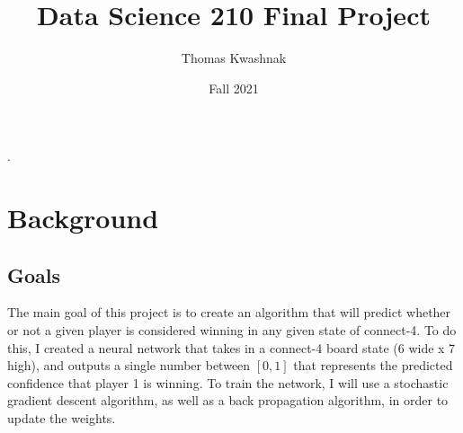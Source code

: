 \documentclass[10pt]{article}
\title{Data Science 210 Final Project}
\author{Thomas Kwashnak}
\date{Fall 2021}
\begin{document}
\maketitle
\setlength{\parindent}{0pt}.
\setlength{\parskip}{\baselineskip}
\lstset{numbers=left, numberstyle=\footnotesize, frame=l} 

\tableofcontents
\newpage

\section{Background}
\subsection{Goals}
The main goal of this project is to create an algorithm that will predict whether or not a given player is considered winning in any given state of connect-4. To do this, I created a neural network that takes in a connect-4 board state (6 wide x 7 high), and outputs a single number between $[0,1]$ that represents the predicted confidence that player 1 is winning. To train the network, I will use a stochastic gradient descent algorithm, as well as a back propagation algorithm, in order to update the weights.
\end{document}

